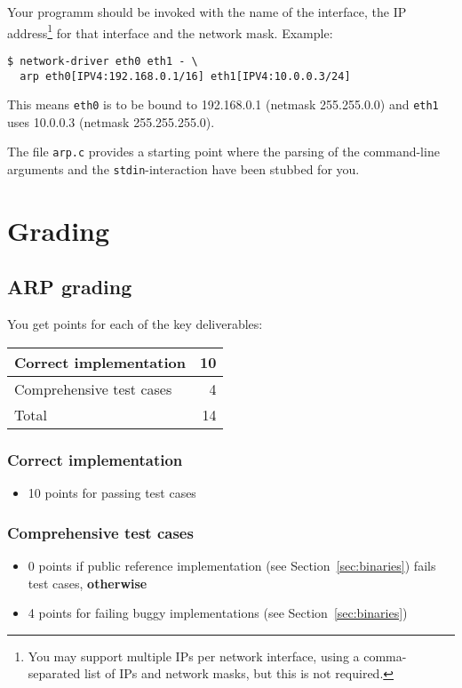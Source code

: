\documentclass{article}
\begin{document}
Your programm should be invoked with the name of the interface, the IP
address\footnote{You may support multiple IPs per network interface,
  using a comma-separated list of IPs and network masks, but this is
  not required.} for that interface and the network mask.  Example:
\begin{verbatim}
$ network-driver eth0 eth1 - \
  arp eth0[IPV4:192.168.0.1/16] eth1[IPV4:10.0.0.3/24]
\end{verbatim}
This means {\tt eth0} is to be bound to 192.168.0.1 (netmask 255.255.0.0)
and {\tt eth1} uses 10.0.0.3 (netmask 255.255.255.0).

The file {\tt arp.c} provides a starting point where the parsing of
the command-line arguments and the {\tt stdin}-interaction have been
stubbed for you.




\section{Grading}



\subsection{ARP grading}

You get points for each of the key deliverables:
\begin{center}
\begin{tabular}{l|r}
Correct implementation                    & 10 \\ \hline
Comprehensive test cases                  &  4 \\ \hline \hline
Total                                     & 14
\end{tabular}
\end{center}


\subsubsection{Correct implementation}
\begin{itemize}
  \item 10 points for passing test cases
\end{itemize}

\subsubsection{Comprehensive test cases}
\begin{itemize}
\item 0 points if public reference implementation (see Section~\ref{sec:binaries})
      fails test cases, {\bf otherwise}
\item 4 points for failing buggy implementations (see Section~\ref{sec:binaries})
\end{itemize}
\end{document}
